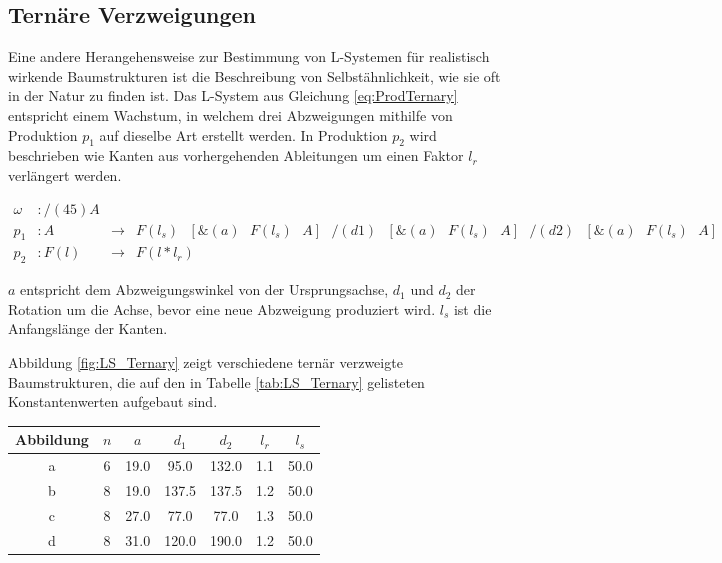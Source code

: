 \subsection{Ternäre Verzweigungen}

Eine andere Herangehensweise zur Bestimmung von L-Systemen für realistisch wirkende Baumstrukturen ist die Beschreibung von Selbstähnlichkeit, wie sie oft in der Natur zu finden ist. \cite[S.173]{ABOP:04} Das L-System aus Gleichung \ref{eq:ProdTernary} entspricht einem Wachstum, in welchem drei Abzweigungen mithilfe von Produktion $p_1$ auf dieselbe Art erstellt werden. In Produktion $p_2$ wird beschrieben wie Kanten aus vorhergehenden Ableitungen um einen Faktor $l_r$ verlängert werden. \cite[S.58]{ABOP:04}

\begin{equation}
\begin{array}{llll}
\omega & : /(45)A \\
p_1 & : A &\rightarrow& F(l_s)\text{ }[\&(a)\text{ }F(l_s)\text{ }A]\text{ }/(d1)\text{ }[\&(a)\text{ }F(l_s)\text{ }A]\text{ }/(d2)\text{ }[\&(a)\text{ }F(l_s)\text{ }A] \\
p_2 &  : F(l) &\rightarrow& F(l * l_r)
\end{array}
\label{eq:ProdTernary}
\end{equation} 
\cite[S.60]{ABOP:04}

$a$ entspricht dem Abzweigungswinkel von der Ursprungsachse, $d_1$ und $d_2$ der Rotation um die Achse, bevor eine neue Abzweigung produziert wird. $l_s$ ist die Anfangslänge der Kanten. \cite[S.58]{ABOP:04}

Abbildung \ref{fig:LS_Ternary} zeigt verschiedene ternär verzweigte Baumstrukturen, die auf den in Tabelle \ref{tab:LS_Ternary} gelisteten Konstantenwerten aufgebaut sind.

\begin{center}
	\begin{tabulary}{\textwidth}{|C|C|C|C|C|C|C|}
		\hline 
		Abbildung & $n$ & $a$ & $d_1$ & $d_2$ & $l_r$ & $l_s$ \\ 
		\hline 
		a & 6 & 19.0 & 95.0 & 132.0 & 1.1 & 50.0 \\ 
		\hline 
		b & 8 & 19.0 & 137.5 & 137.5 & 1.2 & 50.0 \\ 
		\hline 
		c & 8 & 27.0 & 77.0 & 77.0 & 1.3 & 50.0 \\ 
		\hline 
		d & 8 & 31.0 & 120.0 & 190.0 & 1.2 & 50.0 \\ 
		\hline 
	\end{tabulary} 
	\label{tab:LS_Ternary}
\end{center}


